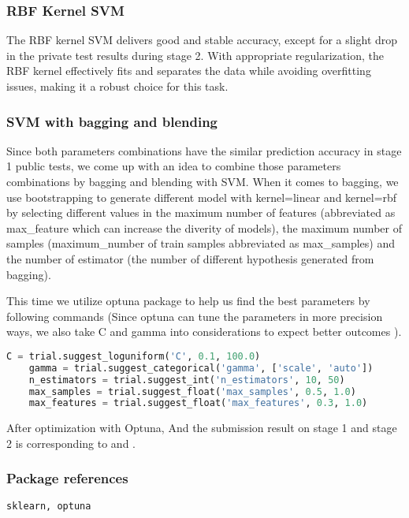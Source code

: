 \subsubsection*{RBF Kernel SVM}
\quad The RBF kernel SVM delivers good and stable accuracy, 
except for a slight drop in the private test results during stage 2. 
With appropriate regularization, the RBF kernel effectively fits and separates the data while avoiding overfitting issues, 
making it a robust choice for this task.



\subsubsection*{SVM with bagging and blending}

\quad Since both parameters combinations have the similar prediction accuracy in stage 1 public tests, we come up with an idea to combine those parameters combinations by 
bagging and blending with SVM. When it comes to bagging, we use bootstrapping to generate different model  
with kernel=linear and kernel=rbf by selecting different values in the maximum number of features 
(abbreviated as max\_feature which can increase the diverity of models), the maximum number of samples (maximum\_number of train samples 
abbreviated as max\_samples) and the number of estimator (the number of different hypothesis generated from bagging).

This time we utilize optuna package to help us find the best parameters by following commands 
(Since optuna can tune the parameters in more precision ways, we also take C and gamma into considerations to expect better outcomes ).
\begin{lstlisting}[language=Python]
    C = trial.suggest_loguniform('C', 0.1, 100.0)
    gamma = trial.suggest_categorical('gamma', ['scale', 'auto'])
    n_estimators = trial.suggest_int('n_estimators', 10, 50)
    max_samples = trial.suggest_float('max_samples', 0.5, 1.0)
    max_features = trial.suggest_float('max_features', 0.3, 1.0)
\end{lstlisting}
\quad After optimization with Optuna, 
And the submission result on stage 1 and stage 2 is corresponding to and .

\subsubsection*{Package references}
\begin{lstlisting}[language=Python]
sklearn, optuna
\end{lstlisting}